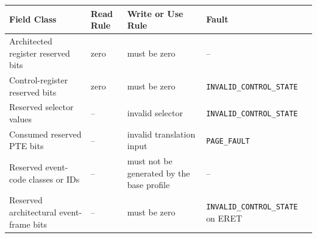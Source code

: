 \Needspace{1.25in}
\begingroup\footnotesize
\setlength{\aboverulesep}{0pt}
\setlength{\belowrulesep}{0pt}
\setlength{\extrarowheight}{1.2pt}
\begin{center}
\begin{tabularx}{\linewidth}{@{}>{\raggedright\arraybackslash}p{1.65in}>{\raggedright\arraybackslash}p{0.75in}>{\raggedright\arraybackslash}p{1.35in}>{\raggedright\arraybackslash}X@{}}
\toprule
\rowcolor{ManualHeaderFill}
\textbf{Field Class} & \textbf{Read Rule} & \textbf{Write or Use Rule} & \textbf{Fault}\\
\midrule
Architected register reserved bits & zero & must be zero & --\\
Control-register reserved bits & zero & must be zero & \texttt{INVALID\_CONTROL\_STATE}\\
Reserved selector values & -- & invalid selector & \texttt{INVALID\_CONTROL\_STATE}\\
Consumed reserved PTE bits & -- & invalid translation input & \texttt{PAGE\_FAULT}\\
Reserved event-code classes or IDs & -- & must not be generated by the base profile & --\\
Reserved architectural event-frame bits & -- & must be zero & \texttt{INVALID\_CONTROL\_STATE} on ERET\\
\bottomrule
\end{tabularx}
\end{center}
\endgroup
